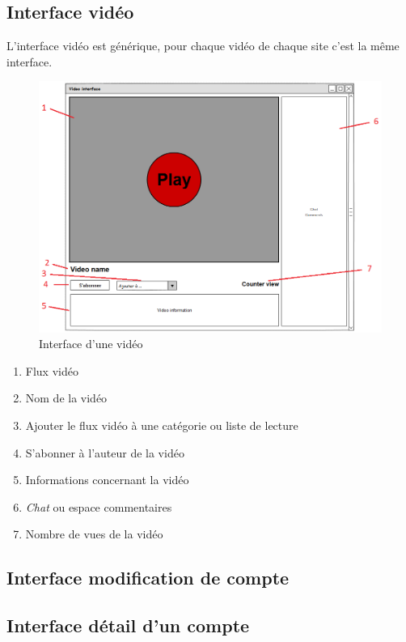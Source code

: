 \documentclass[11pt]{report} %
\begin{document}
		\subsection{Interface vidéo}
		L'interface vidéo est générique, pour chaque vidéo de chaque site c'est la même interface. 
		\begin{figure}[h]
			\center
			\includegraphics[width=1\textwidth]{../img/videoInterfacenum.png}
			\caption{Interface d'une vidéo}
			\label{interfacevideo}
		\end{figure}
		
		\begin{enumerate}
			\item Flux vidéo
			\item Nom de la vidéo
			\item Ajouter le flux vidéo à une catégorie ou liste de lecture
			\item S'abonner à l'auteur de la vidéo
			\item Informations concernant la vidéo
			\item \textit{Chat} ou espace commentaires
			\item Nombre de vues de la vidéo
		\end{enumerate}
		
		\subsection{Interface modification de compte}
		
		\newpage
		
		\subsection{Interface détail d'un compte}
		
\end{document}

